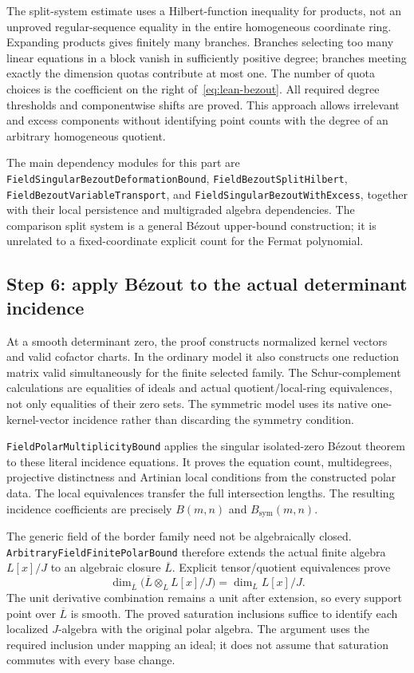 The split-system estimate uses a Hilbert-function inequality for products,
not an unproved regular-sequence equality in the entire homogeneous
coordinate ring.  Expanding products gives finitely many branches.
Branches selecting too many linear equations in a block vanish in
sufficiently positive degree; branches meeting exactly the dimension
quotas contribute at most one.  The number of quota choices is the
coefficient on the right of~\eqref{eq:lean-bezout}.  All required degree
thresholds and componentwise shifts are proved.  This approach allows
irrelevant and excess components without identifying point counts with
the degree of an arbitrary homogeneous quotient.

The main dependency modules for this part are
\nolinkurl{FieldSingularBezoutDeformationBound},
\nolinkurl{FieldBezoutSplitHilbert},
\nolinkurl{FieldBezoutVariableTransport}, and
\nolinkurl{FieldSingularBezoutWithExcess}, together with their local
persistence and multigraded algebra dependencies.  The comparison split
system is a general B\'ezout upper-bound construction; it is unrelated to
a fixed-coordinate explicit count for the Fermat polynomial.

\subsection{Step 6: apply B\'ezout to the actual determinant incidence}
\label{app:lean-incidence}

At a smooth determinant zero, the proof constructs normalized kernel
vectors and valid cofactor charts.  In the ordinary model it also
constructs one reduction matrix valid simultaneously for the finite
selected family.  The Schur-complement calculations are equalities of
ideals and actual quotient/local-ring equivalences, not only equalities
of their zero sets.  The symmetric model uses its native one-kernel-vector
incidence rather than discarding the symmetry condition.

\nolinkurl{FieldPolarMultiplicityBound} applies the singular isolated-zero
B\'ezout theorem to these literal incidence equations.  It proves the
equation count, multidegrees, projective distinctness and Artinian local
conditions from the constructed polar data.  The local equivalences
transfer the full intersection lengths.  The resulting incidence
coefficients are precisely $B(m,n)$ and $B_{\mathrm{sym}}(m,n)$.

The generic field of the border family need not be algebraically closed.
\nolinkurl{ArbitraryFieldFinitePolarBound} therefore extends the actual
finite algebra $L[x]/J$ to an algebraic closure $\overline L$.  Explicit
tensor/quotient equivalences prove
\[
 \dim_{\overline L}\bigl(\overline L\otimes_L L[x]/J\bigr)
 =\dim_L L[x]/J.
\]
The unit derivative combination remains a unit after extension, so every
support point over $\overline L$ is smooth.  The proved saturation
inclusions suffice to identify each localized $J$-algebra with the
original polar algebra.  The argument uses the required inclusion under
mapping an ideal; it does not assume that saturation commutes with every
base change.


